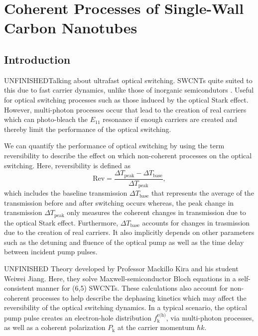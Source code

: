 \chapter{Coherent Processes of Single-Wall Carbon Nanotubes}

\section{Introduction}


{\color{red} UNFINISHED}Talking about ultrafast optical switching. SWCNTs quite suited to this due to fast carrier dynamics, unlike those of inorganic semicondutors \cite{maeda2006gigantic}. Useful for optical switching processes such as those induced by the optical Stark effect. However, multi-photon processes occur that lead to the creation of real carriers which can photo-bleach the $E_{11}$ resonance if enough carriers are created and thereby limit the performance of the optical switching.

We can quantify the performance of optical switching by using the term reversibility to describe the effect on which non-coherent processes on the optical switching. Here, reversibility is defined as
%
\begin{equation}
 	\text{Rev} = \dfrac{\Delta T_\text{peak} - \Delta T_\text{base}}{\Delta T_\text{peak}},
\end{equation}
%
which includes the baseline transmission $\Delta T_\text{base}$ that represents the average of the transmission before and after switching occurs whereas, the peak change in transmission $\Delta T_\text{peak}$ only measures the coherent changes in transmission due to the optical Stark effect. Furthermore, $\Delta T_\text{base}$ accounts for changes in trasmission due to the creation of real carriers. It also implicitly depends on other parameters such as the detuning and fluence of the optical pump as well as the time delay between incident pump pulses.

{\color{red} UNFINISHED} Theory developed by Professor Mackillo Kira and his student Weiwei Jiang. Here, they solve Maxwell-semiconductor Bloch equations \cite{kira2011semiconductor} in a self-consistent manner for (6,5) SWCNTs. These calculations also account for non-coherent processes to help describe the dephasing kinetics which may affect the reversibility of the optical switching dynamics. In a typical scenario, the optical pump pulse creates an electron-hole distribution $f_\text{k}^\text{e(h)}$, via multi-photon processes, as well as a coherent polarization $P_\text{k}$ at the carrier momentum $\hbar k$.


